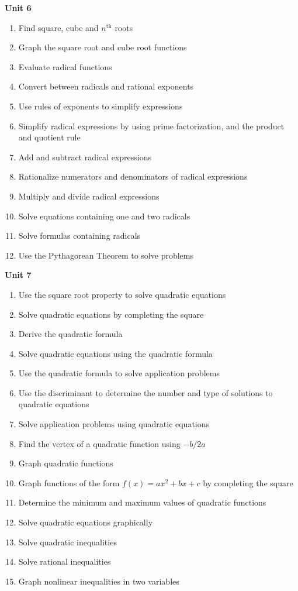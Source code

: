 \documentclass[10pt]{article}
\newenvironment{alphalist}{
\begin{enumerate}[label=(\arabic*),widest=107 ,leftmargin=25pt, itemsep=0pt]}
{\end{enumerate}}
\begin{document}
\noindent \textbf{Unit 6}
\begin{alphalist}
    \item Find square, cube and $n^\mathrm{th}$  roots
    \item Graph the square root and cube root functions
    \item Evaluate radical functions
    \item Convert between radicals and rational exponents
    \item Use rules of exponents to simplify expressions
    \item Simplify radical expressions by using prime factorization, and the product and quotient rule
    \item Add and subtract radical expressions
    \item Rationalize numerators and denominators of radical expressions
    \item Multiply and divide radical expressions
    \item Solve equations containing one and two radicals
    \item Solve formulas containing radicals
    \item Use the Pythagorean Theorem to solve problems 
\end{alphalist}
\noindent \textbf{Unit 7}
\begin{alphalist}
    \item Use the square root property to solve quadratic equations
    \item Solve quadratic equations by completing the square
    \item Derive the quadratic formula
    \item Solve quadratic equations using the quadratic formula
    \item Use the quadratic formula to solve application problems
    \item Use the discriminant to determine the number and type of solutions to quadratic equations
    \item Solve application problems using quadratic equations
    \item Find the vertex of a quadratic function using $-b/2a$
    \item Graph quadratic functions
    \item Graph functions of the form $f(x) = ax^2 + bx + c$ by completing the square
    \item Determine the minimum and maximum values of quadratic functions
    \item Solve quadratic equations graphically
    \item Solve quadratic inequalities
    \item Solve rational inequalities
    \item Graph nonlinear inequalities in two variables
\end{alphalist}
\end{document}
